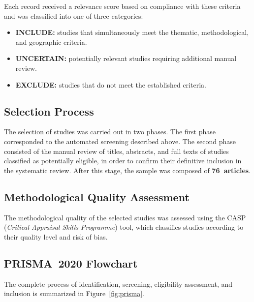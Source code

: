 \documentclass[conference]{IEEEtran}
\begin{document}
Each record received a relevance score based on compliance
with these criteria and was classified into one of three
categories:

\begin{itemize}
  \item \textbf{INCLUDE:} studies that simultaneously meet
    the thematic, methodological, and geographic criteria.
  \item \textbf{UNCERTAIN:} potentially relevant studies
    requiring additional manual review.
  \item \textbf{EXCLUDE:} studies that do not meet the
    established criteria.
\end{itemize}

\subsection{Selection Process}

The selection of studies was carried out in two phases. The
first phase corresponded to the automated screening described
above. The second phase consisted of the manual review of
titles, abstracts, and full texts of studies classified as
potentially eligible, in order to confirm their definitive
inclusion in the systematic review. After this stage, the
sample was composed of \textbf{76~articles}.

\subsection{Methodological Quality Assessment}

The methodological quality of the selected studies was
assessed using the CASP (\textit{Critical Appraisal Skills
Programme}) tool, which classifies studies according to their
quality level and risk of bias.

\subsection{PRISMA~2020 Flowchart}

The complete process of identification, screening,
eligibility assessment, and inclusion is summarized in
Figure~\ref{fig:prisma}.
\end{document}
